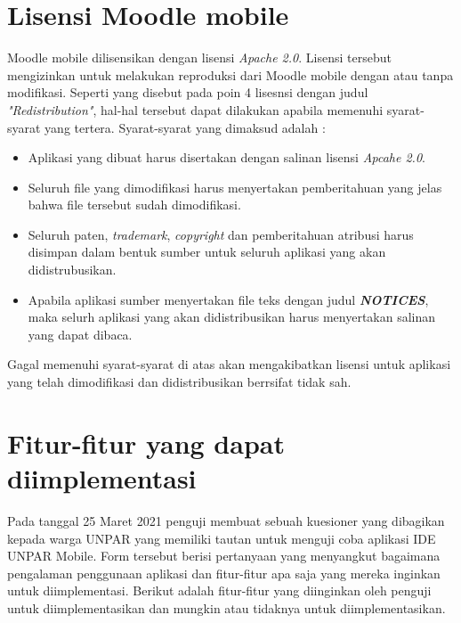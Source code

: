 \section{Lisensi Moodle mobile}

Moodle mobile dilisensikan dengan lisensi \textit{Apache 2.0}\cite{Moodlemobile:license}. Lisensi tersebut mengizinkan untuk melakukan reproduksi dari Moodle mobile dengan atau tanpa modifikasi. Seperti yang disebut pada poin 4 lisesnsi dengan judul \textit{"Redistribution"}, hal-hal tersebut dapat dilakukan apabila memenuhi syarat-syarat yang tertera. Syarat-syarat yang dimaksud adalah :
\begin{itemize}
\item Aplikasi yang dibuat harus disertakan dengan salinan lisensi \textit{Apcahe 2.0}.
\item Seluruh file yang dimodifikasi harus menyertakan pemberitahuan yang jelas bahwa file tersebut sudah dimodifikasi.
\item Seluruh paten, \textit{trademark}, \textit{copyright} dan pemberitahuan atribusi harus disimpan dalam bentuk sumber untuk seluruh aplikasi yang akan didistrubusikan.
\item Apabila aplikasi sumber menyertakan file teks dengan judul \textit{\textbf{NOTICES}}, maka selurh aplikasi yang akan didistribusikan harus menyertakan salinan yang dapat dibaca.
\end{itemize}
Gagal memenuhi syarat-syarat di atas akan mengakibatkan lisensi untuk aplikasi yang telah dimodifikasi dan didistribusikan berrsifat tidak sah.

\section{Fitur-fitur yang dapat diimplementasi}

Pada tanggal 25 Maret 2021 penguji membuat sebuah kuesioner yang dibagikan kepada warga UNPAR yang memiliki tautan untuk menguji coba aplikasi IDE UNPAR Mobile. Form tersebut berisi pertanyaan yang menyangkut bagaimana pengalaman penggunaan aplikasi dan fitur-fitur apa saja yang mereka inginkan untuk diimplementasi. Berikut adalah fitur-fitur yang diinginkan oleh penguji untuk diimplementasikan dan mungkin atau tidaknya untuk diimplementasikan.

